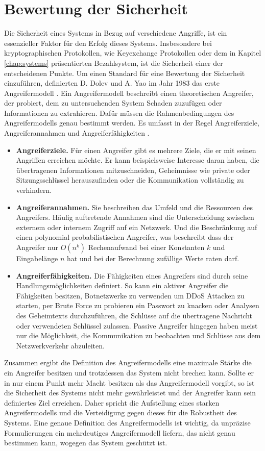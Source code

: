 \documentclass[
	fontsize=11pt,
	headings=small,
	parskip=half,           %
	bibliography=totoc,
	numbers=noenddot,       %
	open=any,               %
]{scrreprt}
\begin{document}
\section{Bewertung der Sicherheit}
\label{sec:auswertungSecurity}
Die Sicherheit eines Systems in Bezug auf verschiedene Angriffe, ist ein essenzieller Faktor für den Erfolg dieses Systems. Insbesondere bei kryptographischen Protokollen, wie Keyexchange Protokollen oder dem in Kapitel \ref{chap:systems} präsentierten Bezahlsystem, ist die Sicherheit einer der entscheidenen Punkte. Um einen Standard für eine Bewertung der Sicherheit einzuführen, definierten D. Dolev und A. Yao im Jahr 1983 das erste Angreifermodell \cite{am-dolev1983security}. Ein Angreifermodell beschreibt einen theoretischen Angreifer, der probiert, dem zu untersuchenden System Schaden zuzufügen oder Informationen zu extrahieren. Dafür müssen die Rahmenbedingungen des Angreifermodells genau bestimmt werden. Es umfasst in der Regel Angreiferziele, Angreiferannahmen und Angreiferfähigkeiten \cite{am-do2019role}. 
\begin{itemize}
    \item \textbf{Angreiferziele.} Für einen Angreifer gibt es mehrere Ziele, die er mit seinen Angriffen erreichen möchte. Er kann beispielsweise Interesse daran haben, die übertragenen Informationen mitzuschneiden, Geheimnisse wie private oder Sitzungsschlüssel herauszufinden oder die Kommunikation vollständig zu verhindern. 
    \item \textbf{Angreiferannahmen.} Sie beschreiben das Umfeld und die Ressourcen des Angreifers. Häufig auftretende Annahmen sind die Unterscheidung zwischen externem oder internem Zugriff auf ein Netzwerk. Und die Beschränkung auf einen polynomial probabilistischen Angreifer, was beschreibt dass der Angreifer nur $O(n^k)$ Rechenaufwand bei einer Konstanten $k$ und Eingabelänge $n$ hat und bei der Berechnung zufällige Werte raten darf.
    \item \textbf{Angreiferfähigkeiten.} Die Fähigkeiten eines Angreifers sind durch seine Handlungsmöglichkeiten definiert. So kann ein aktiver Angreifer die Fähigkeiten besitzen, Botnetzwerke zu verwenden um DDoS Attacken zu starten, per Brute Force zu probieren ein Passwort zu knacken oder Analysen des Geheimtexts durchzuführen, die Schlüsse auf die übertragene Nachricht oder verwendeten Schlüssel zulassen. Passive Angreifer hingegen haben meist nur die Möglichkeit, die Kommunikation zu beobachten und Schlüsse aus dem Netzwerkverkehr abzuleiten.
\end{itemize} 
Zusammen ergibt die Definition des Angreifermodells eine maximale Stärke die ein Angreifer besitzen und trotzdessen das System nicht brechen kann. Sollte er in nur einem Punkt mehr Macht besitzen als das Angreifermodell vorgibt, so ist die Sicherheit des Systems nicht mehr gewährleistet und der Angreifer kann sein definiertes Ziel erreichen. Daher spricht die Aufstellung eines starken Angreifermodells und die Verteidigung gegen dieses für die Robustheit des Systems. Eine genaue Definition des Angreifermodells ist wichtig, da unpräzise Formulierungen ein mehrdeutiges Angreifermodell liefern, das nicht genau bestimmen kann, wogegen das System geschützt ist.
\end{document}
